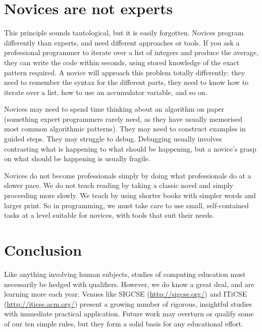 \documentclass{article}
\begin{document}
\section{Novices are not experts}\label{not-experts}

This principle sounds tautological, but it is easily forgotten.
Novices program differently than experts,
and need different approaches or tools.
If you ask a professional programmer to iterate over a list of integers and produce the average,
they can write the code within seconds,
using stored knowledge of the exact pattern required.
A novice will approach this problem totally differently:
they need to remember the syntax for the different parts,
they need to know how to iterate over a list,
how to use an accumulator variable,
and so on.

Novices may need to spend time thinking about an algorithm on paper
(something expert programmers rarely need,
as they have usually memorised most common algorithmic patterns).
They may need to construct examples in guided steps.
They may struggle to debug.
Debugging usually involves contrasting what is happening to what should be happening,
but a novice's grasp on what should be happening is usually fragile.

Novices do not become professionals simply by doing what professionals do at a slower pace.
We do not teach reading by taking a classic novel and simply proceeding more slowly.
We teach by using shorter books with simpler words and larger print.
So in programming,
we must take care to use small, self-contained tasks at a level suitable for novices,
with tools that suit their needs.

\section*{Conclusion}

Like anything involving human subjects,
studies of computing education must necessarily be hedged with qualifiers.
However,
we do know a great deal,
and are learning more each year.
Venues like SIGCSE (\url{http://sigcse.org/}) and ITiCSE (\url{http://iticse.acm.org/})
present a growing number of rigorous, insightful studies
with immediate practical application.
Future work may overturn or qualify some of our ten simple rules,
but they form a solid basis for any educational effort.



\end{document}
